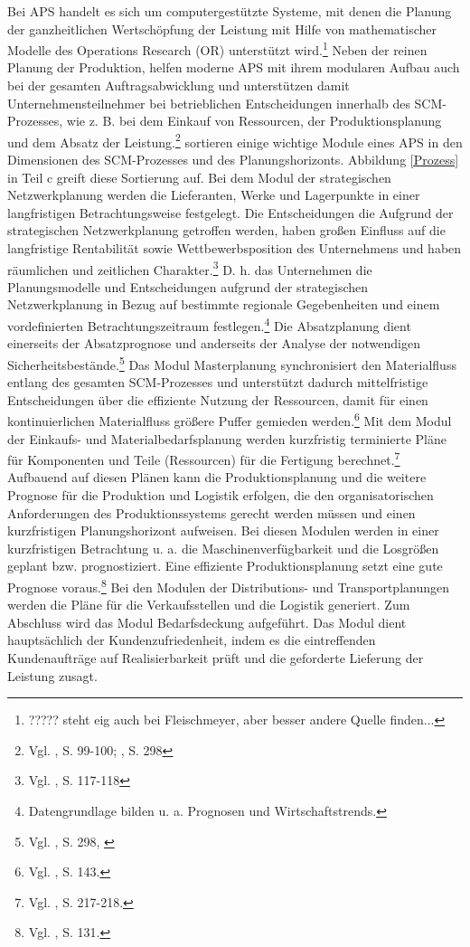 Bei APS handelt es sich um computergestützte Systeme, mit denen die Planung der ganzheitlichen Wertschöpfung der Leistung mit Hilfe von mathematischer Modelle des Operations Research (OR) unterstützt wird.\footnote{????? steht eig auch bei Fleischmeyer, aber besser andere Quelle finden...} Neben der reinen Planung der Produktion, helfen moderne APS mit ihrem modularen Aufbau auch bei der gesamten Auftragsabwicklung und unterstützen damit Unternehmensteilnehmer bei betrieblichen Entscheidungen innerhalb des SCM-Prozesses, wie z. B. bei dem Einkauf von Ressourcen, der Produktionsplanung und dem Absatz der Leistung.\footnote{Vgl. \cite{meyr2015structure}, S. 99-100; \cite{fleischmeyr2004codp}, S. 298} \cite{meyr2015structure} sortieren einige wichtige Module eines APS in den Dimensionen des SCM-Prozesses und des Planungshorizonts. Abbildung \ref{Prozess} in Teil c greift diese Sortierung auf. Bei dem Modul der strategischen Netzwerkplanung werden die Lieferanten, Werke und Lagerpunkte in einer langfristigen Betrachtungsweise festgelegt. Die Entscheidungen die Aufgrund der strategischen Netzwerkplanung getroffen werden, haben großen Einfluss auf die langfristige Rentabilität sowie Wettbewerbsposition des Unternehmens und haben räumlichen und zeitlichen Charakter.\footnote{Vgl. \cite{goetschalckx2005strategic}, S. 117-118} D. h. das Unternehmen die Planungsmodelle und Entscheidungen aufgrund der strategischen Netzwerkplanung in Bezug auf bestimmte regionale Gegebenheiten und einem vordefinierten Betrachtungszeitraum festlegen.\footnote{Datengrundlage bilden u. a. Prognosen und Wirtschaftstrends.} Die Absatzplanung dient einerseits der Absatzprognose und anderseits der Analyse der notwendigen Sicherheitsbestände.\footnote{Vgl. \cite{fleischmeyr2004codp}, S. 298, \label{fleisch}} Das Modul Masterplanung synchronisiert den Materialfluss entlang des gesamten SCM-Prozesses und unterstützt dadurch mittelfristige Entscheidungen über die effiziente Nutzung der Ressourcen, damit für einen kontinuierlichen Materialfluss größere Puffer gemieden werden.\footnote{Vgl. \cite{rohde2002scm}, S. 143.} Mit dem Modul der Einkaufs- und Materialbedarfsplanung werden kurzfristig terminierte Pläne für Komponenten und Teile (Ressourcen) für die Fertigung berechnet.\footnote{Vgl. \cite{stadler2008aps}, S. 217-218.} Aufbauend auf diesen Plänen kann die Produktionsplanung und die weitere Prognose für die Produktion und Logistik erfolgen, die den organisatorischen Anforderungen des Produktionssystems gerecht werden müssen und einen kurzfristigen Planungshorizont aufweisen. Bei diesen Modulen werden in einer kurzfristigen Betrachtung u. a. die Maschinenverfügbarkeit und die Losgrößen geplant bzw. prognostiziert. Eine effiziente Produktionsplanung setzt eine gute Prognose voraus.\footnote{Vgl. \cite{dickersback2004pp}, S. 131.} Bei den Modulen der Distributions- und Transportplanungen werden die Pläne für die Verkaufsstellen und die Logistik generiert. Zum Abschluss wird das Modul Bedarfsdeckung aufgeführt. Das Modul dient hauptsächlich der Kundenzufriedenheit, indem es die eintreffenden Kundenaufträge auf Realisierbarkeit prüft und die geforderte Lieferung der Leistung zusagt.

